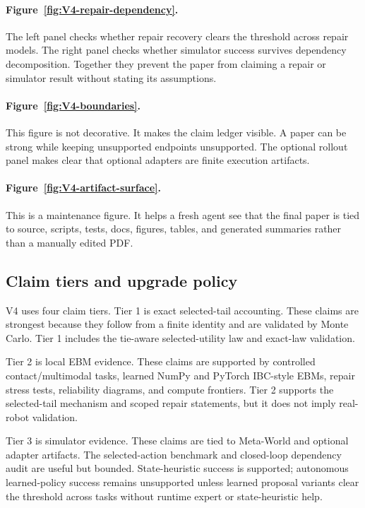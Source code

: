 \paragraph{Figure~\ref{fig:V4-repair-dependency}.}
The left panel checks whether repair recovery clears the threshold across
repair models. The right panel checks whether simulator success survives
dependency decomposition. Together they prevent the paper from claiming a
repair or simulator result without stating its assumptions.

\paragraph{Figure~\ref{fig:V4-boundaries}.}
This figure is not decorative. It makes the claim ledger visible. A paper can
be strong while keeping unsupported endpoints unsupported. The optional
rollout panel makes clear that optional adapters are finite execution
artifacts.

\paragraph{Figure~\ref{fig:V4-artifact-surface}.}
This is a maintenance figure. It helps a fresh agent see that the final paper
is tied to source, scripts, tests, docs, figures, tables, and generated
summaries rather than a manually edited PDF.

\subsection{Claim tiers and upgrade policy}
\label{app:V4-claim-tiers}

V4 uses four claim tiers. Tier 1 is exact selected-tail accounting. These
claims are strongest because they follow from a finite identity and are
validated by Monte Carlo. Tier 1 includes the tie-aware selected-utility law
and exact-law validation.

Tier 2 is local EBM evidence. These claims are supported by controlled
contact/multimodal tasks, learned NumPy and PyTorch IBC-style EBMs, repair
stress tests, reliability diagrams, and compute frontiers. Tier 2 supports the
selected-tail mechanism and scoped repair statements, but it does not imply
real-robot validation.

Tier 3 is simulator evidence. These claims are tied to Meta-World and optional
adapter artifacts. The selected-action benchmark and closed-loop dependency
audit are useful but bounded. State-heuristic success is supported; autonomous
learned-policy success remains unsupported unless learned proposal variants
clear the threshold across tasks without runtime expert or state-heuristic
help.


